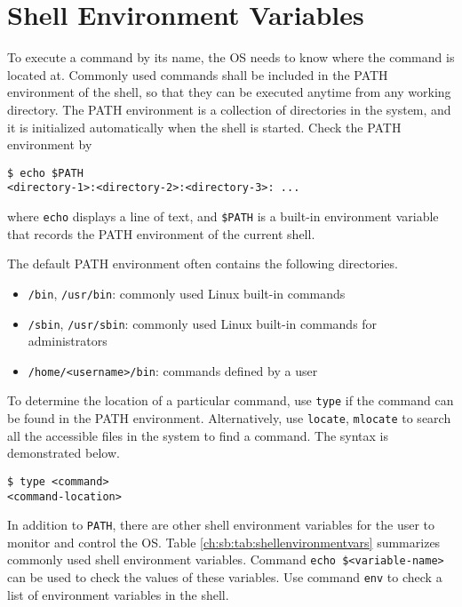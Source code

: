 \section{Shell Environment Variables}\label{ch:sb:subsec:shellenvvar}

To execute a command by its name, the OS needs to know where the command is located at. Commonly used commands shall be included in the PATH environment of the shell, so that they can be executed anytime from any working directory. The PATH environment is a collection of directories in the system, and it is initialized automatically when the shell is started. Check the PATH environment by
\begin{lstlisting}
$ echo $PATH
<directory-1>:<directory-2>:<directory-3>: ...
\end{lstlisting}
where \verb|echo| displays a line of text, and \verb|$PATH| is a built-in environment variable that records the PATH environment of the current shell. 

The default PATH environment often contains the following directories. 
\begin{itemize}
\item \verb|/bin|, \verb|/usr/bin|: commonly used Linux built-in commands
\item \verb|/sbin|, \verb|/usr/sbin|: commonly used Linux built-in commands for administrators
\item \verb|/home/<username>/bin|: commands defined by a user
\end{itemize}
To determine the location of a particular command, use \verb|type| if the command can be found in the PATH environment. Alternatively, use \verb|locate|, \verb|mlocate| to search all the accessible files in the system to find a command. The syntax is demonstrated below.
\begin{lstlisting}
$ type <command>
<command-location>
\end{lstlisting}

In addition to \verb|PATH|, there are other shell environment variables for the user to monitor and control the OS. Table \ref{ch:sb:tab:shellenvironmentvars} summarizes commonly used shell environment variables. Command \verb|echo $<variable-name>| can be used to check the values of these variables. Use command \verb|env| to check a list of environment variables in the shell.


